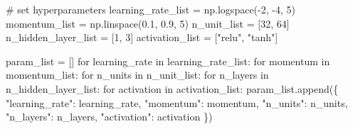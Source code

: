 \documentclass[
  letterpaper,
  DIV=11,
  numbers=noendperiod]{scrreprt}
\newenvironment{Shaded}{\begin{snugshade}}{\end{snugshade}}
\newcommand{\CommentTok}[1]{\textcolor[rgb]{0.37,0.37,0.37}{#1}}
\newcommand{\ControlFlowTok}[1]{\textcolor[rgb]{0.00,0.23,0.31}{#1}}
\newcommand{\DecValTok}[1]{\textcolor[rgb]{0.68,0.00,0.00}{#1}}
\newcommand{\FloatTok}[1]{\textcolor[rgb]{0.68,0.00,0.00}{#1}}
\newcommand{\KeywordTok}[1]{\textcolor[rgb]{0.00,0.23,0.31}{#1}}
\newcommand{\NormalTok}[1]{\textcolor[rgb]{0.00,0.23,0.31}{#1}}
\newcommand{\OperatorTok}[1]{\textcolor[rgb]{0.37,0.37,0.37}{#1}}
\newcommand{\StringTok}[1]{\textcolor[rgb]{0.13,0.47,0.30}{#1}}
\begin{document}
\begin{Shaded}
\begin{Highlighting}[]
\CommentTok{\# set hyperparameters}
\NormalTok{learning\_rate\_list  }\OperatorTok{=}\NormalTok{ np.logspace(}\OperatorTok{{-}}\DecValTok{2}\NormalTok{, }\OperatorTok{{-}}\DecValTok{4}\NormalTok{, }\DecValTok{5}\NormalTok{)}
\NormalTok{momentum\_list       }\OperatorTok{=}\NormalTok{ np.linspace(}\FloatTok{0.1}\NormalTok{, }\FloatTok{0.9}\NormalTok{, }\DecValTok{5}\NormalTok{)}
\NormalTok{n\_unit\_list         }\OperatorTok{=}\NormalTok{ [}\DecValTok{32}\NormalTok{, }\DecValTok{64}\NormalTok{]}
\NormalTok{n\_hidden\_layer\_list }\OperatorTok{=}\NormalTok{ [}\DecValTok{1}\NormalTok{, }\DecValTok{3}\NormalTok{]}
\NormalTok{activation\_list     }\OperatorTok{=}\NormalTok{ [}\StringTok{"relu"}\NormalTok{, }\StringTok{"tanh"}\NormalTok{]}

\NormalTok{param\_list }\OperatorTok{=}\NormalTok{ []}
\ControlFlowTok{for}\NormalTok{ learning\_rate }\KeywordTok{in}\NormalTok{ learning\_rate\_list:}
    \ControlFlowTok{for}\NormalTok{ momentum }\KeywordTok{in}\NormalTok{ momentum\_list:}
        \ControlFlowTok{for}\NormalTok{ n\_units }\KeywordTok{in}\NormalTok{ n\_unit\_list:}
            \ControlFlowTok{for}\NormalTok{ n\_layers }\KeywordTok{in}\NormalTok{ n\_hidden\_layer\_list:}
                \ControlFlowTok{for}\NormalTok{ activation }\KeywordTok{in}\NormalTok{ activation\_list:}
\NormalTok{                    param\_list.append(\{}
                        \StringTok{"learning\_rate"}\NormalTok{: learning\_rate,}
                        \StringTok{"momentum"}\NormalTok{: momentum,}
                        \StringTok{"n\_units"}\NormalTok{: n\_units,}
                        \StringTok{"n\_layers"}\NormalTok{: n\_layers,}
                        \StringTok{"activation"}\NormalTok{: activation}
\NormalTok{                    \})}
\end{Highlighting}
\end{Shaded}
\end{document}
